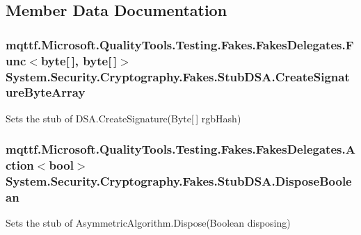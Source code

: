 \subsection{Member Data Documentation}
\hypertarget{class_system_1_1_security_1_1_cryptography_1_1_fakes_1_1_stub_d_s_a_aa1995b4670361318ab51e798054b16ac}{
\subsubsection[{Create\-Signature\-Byte\-Array}]{\setlength{\rightskip}{0pt plus 5cm}mqttf.\-Microsoft.\-Quality\-Tools.\-Testing.\-Fakes.\-Fakes\-Delegates.\-Func$<$byte\mbox{[}$\,$\mbox{]}, byte\mbox{[}$\,$\mbox{]}$>$ System.\-Security.\-Cryptography.\-Fakes.\-Stub\-D\-S\-A.\-Create\-Signature\-Byte\-Array}}\label{class_system_1_1_security_1_1_cryptography_1_1_fakes_1_1_stub_d_s_a_aa1995b4670361318ab51e798054b16ac}


Sets the stub of D\-S\-A.\-Create\-Signature(\-Byte\mbox{[}$\,$\mbox{]} rgb\-Hash)

\hypertarget{class_system_1_1_security_1_1_cryptography_1_1_fakes_1_1_stub_d_s_a_ad70612a08f0f754bf6993fd441e7e44a}{
\subsubsection[{Dispose\-Boolean}]{\setlength{\rightskip}{0pt plus 5cm}mqttf.\-Microsoft.\-Quality\-Tools.\-Testing.\-Fakes.\-Fakes\-Delegates.\-Action$<$bool$>$ System.\-Security.\-Cryptography.\-Fakes.\-Stub\-D\-S\-A.\-Dispose\-Boolean}}\label{class_system_1_1_security_1_1_cryptography_1_1_fakes_1_1_stub_d_s_a_ad70612a08f0f754bf6993fd441e7e44a}


Sets the stub of Asymmetric\-Algorithm.\-Dispose(\-Boolean disposing)

